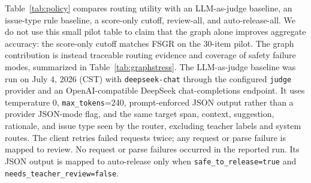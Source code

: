 \documentclass[11pt]{article}
\begin{document}
Table~\ref{tab:policy} compares routing utility with an LLM-as-judge baseline,
an issue-type rule baseline, a score-only cutoff, review-all, and
auto-release-all. We do not use this small pilot table to claim that the graph
alone improves aggregate accuracy: the score-only cutoff matches FSGR on the
30-item pilot. The graph contribution is instead traceable routing evidence and
coverage of safety failure modes, summarized in Table~\ref{tab:graphstress}.
The LLM-as-judge baseline was run on July 4, 2026 (CST) with
\texttt{deepseek-chat} through the configured \texttt{judge} provider and an
OpenAI-compatible DeepSeek chat-completions endpoint. It uses temperature 0,
\texttt{max\_tokens}=240, prompt-enforced JSON output rather than a provider
JSON-mode flag, and the same target span, context, suggestion, rationale, and
issue type seen by the router, excluding teacher labels and system routes. The
client retries failed requests twice; any request or parse failure is mapped to
review. No request or parse failures occurred in the reported run. Its JSON
output is mapped to auto-release only when \texttt{safe\_to\_release=true} and
\texttt{needs\_teacher\_review=false}.

\begin{table}[t]
\centering
\scriptsize
\setlength{\tabcolsep}{2pt}
\caption{Teacher-pilot routing utility over 30 blind-rated feedback items. Auto
n is the number automatically released; Safe n is the number judged
teacher-safe; Review rec. is recall for teacher-marked review-needed items.
Trace indicates whether an exported span-suggestion-dimension-route audit path
is available.}
\label{tab:policy}
\end{table}
\end{document}
